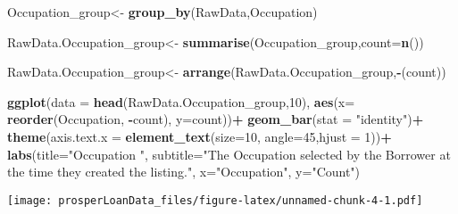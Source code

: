 \documentclass[]{article}
\newenvironment{Shaded}{\begin{snugshade}}{\end{snugshade}}
\newcommand{\DataTypeTok}[1]{\textcolor[rgb]{0.13,0.29,0.53}{#1}}
\newcommand{\DecValTok}[1]{\textcolor[rgb]{0.00,0.00,0.81}{#1}}
\newcommand{\KeywordTok}[1]{\textcolor[rgb]{0.13,0.29,0.53}{\textbf{#1}}}
\newcommand{\NormalTok}[1]{#1}
\newcommand{\OperatorTok}[1]{\textcolor[rgb]{0.81,0.36,0.00}{\textbf{#1}}}
\newcommand{\StringTok}[1]{\textcolor[rgb]{0.31,0.60,0.02}{#1}}
\begin{document}
\begin{Shaded}
\begin{Highlighting}[]
\NormalTok{Occupation_group<-}\StringTok{ }
\StringTok{  }\KeywordTok{group_by}\NormalTok{(RawData,Occupation)}

\NormalTok{RawData.Occupation_group<-}
\StringTok{  }\KeywordTok{summarise}\NormalTok{(Occupation_group,}\DataTypeTok{count=}\KeywordTok{n}\NormalTok{())}

\NormalTok{RawData.Occupation_group<-}
\StringTok{  }\KeywordTok{arrange}\NormalTok{(RawData.Occupation_group,}\OperatorTok{-}\NormalTok{(count))}



\KeywordTok{ggplot}\NormalTok{(}\DataTypeTok{data =} \KeywordTok{head}\NormalTok{(RawData.Occupation_group,}\DecValTok{10}\NormalTok{),}
       \KeywordTok{aes}\NormalTok{(}\DataTypeTok{x=} \KeywordTok{reorder}\NormalTok{(Occupation, }\OperatorTok{-}\NormalTok{count), }
           \DataTypeTok{y=}\NormalTok{count))}\OperatorTok{+}
\StringTok{  }\KeywordTok{geom_bar}\NormalTok{(}\DataTypeTok{stat =} \StringTok{"identity"}\NormalTok{)}\OperatorTok{+}
\StringTok{  }\KeywordTok{theme}\NormalTok{(}\DataTypeTok{axis.text.x =} \KeywordTok{element_text}\NormalTok{(}\DataTypeTok{size=}\DecValTok{10}\NormalTok{, }\DataTypeTok{angle=}\DecValTok{45}\NormalTok{,}\DataTypeTok{hjust =} \DecValTok{1}\NormalTok{))}\OperatorTok{+}
\StringTok{  }\KeywordTok{labs}\NormalTok{(}\DataTypeTok{title=}\StringTok{"Occupation "}\NormalTok{,}
       \DataTypeTok{subtitle=}\StringTok{"The Occupation selected by the Borrower at the time they created the listing."}\NormalTok{,}
       \DataTypeTok{x=}\StringTok{"Occupation"}\NormalTok{,}
       \DataTypeTok{y=}\StringTok{"Count"}\NormalTok{)}
\end{Highlighting}
\end{Shaded}

\texttt{[image: prosperLoanData\_files/figure-latex/unnamed-chunk-4-1.pdf]}
\end{document}
